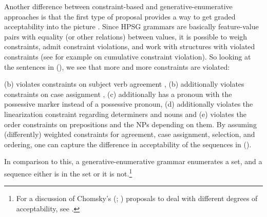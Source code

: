 \documentclass[output=paper,biblatex,babelshorthands,newtxmath,draftmode,colorlinks,citecolor=brown]{langscibook}
\begin{document}
Another difference between constraint-based and generative-enumerative approaches is that the first
type of proposal provides a way to get graded acceptability into the picture
\citep[Section~3.1]{PS2001a}. Since HPSG grammars are basically feature-value pairs with equality
(or other relations) between values, it is possible to weigh constraints, admit constraint
violations, and work with structures with violated constraints (see for example \citealp{SK2005a} on
cumulative constraint violation). So looking at the sentences in (), we see that more and
more constraints are violated:

\eal
{}
\zl
(b) violates constraints on subject verb agreement
, (b) additionally
violates constraints on case assignment , (c) additionally has a pronoun with the
possessive marker instead of a possessive pronoun, (d) additionally violates the
linearization constraint regarding determiners and nouns  and (e)
violates the order constraints on prepositions and the NPs depending on them. By assuming
(differently) weighted constraints for agreement, case assignment, selection, and ordering, one can
capture the difference in acceptability of the sequences in ().

In comparison to this, a generative-enumerative grammar enumerates a set, and a
sequence either is in the set or it is not.\footnote{%
For a discussion of Chomsky's
(\citeyear{Chomsky64a}; \citeyear[Chapter~5]{Chomsky75a}) proposals to deal with different degrees
of acceptability, see .
}

\end{document}
